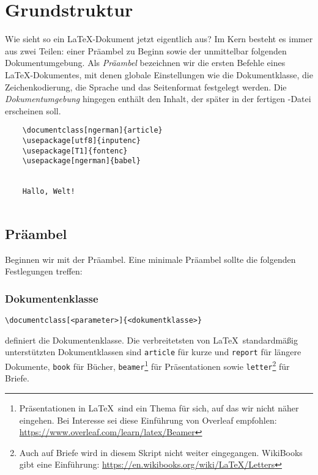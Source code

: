 \section{Grundstruktur}

Wie sieht so ein \LaTeX-Dokument jetzt eigentlich aus?
Im Kern besteht es immer aus zwei Teilen: einer Präambel zu Beginn sowie der unmittelbar folgenden Dokumentumgebung.
Als \emph{Präambel} bezeichnen wir die ersten Befehle eines \LaTeX-Dokumentes, mit denen globale Einstellungen wie die Dokumentklasse, die Zeichenkodierung, die Sprache und das Seitenformat festgelegt werden.
Die \emph{Dokumentumgebung} hingegen enthält den Inhalt, der später in der fertigen -Datei erscheinen soll.

\begin{listing}[H]
  \begin{verbatim}
    \documentclass[ngerman]{article}
    \usepackage[utf8]{inputenc}
    \usepackage[T1]{fontenc}
    \usepackage[ngerman]{babel}
  
    
    Hallo, Welt!
    
  \end{verbatim}
  \caption{Beispielhafter Aufbau eines einfachen \LaTeX-Dokuments mit Präambel und Dokumentumgebung}
  \label{lst:grundaufbau-latex-dokument}
\end{listing}

\subsection{Präambel}
Beginnen wir mit der Präambel.
Eine minimale Präambel sollte die folgenden Festlegungen treffen:

\subsubsection{Dokumentenklasse}\label{subsubsec:dokumentklasse}
\begin{verbatim}
\documentclass[<parameter>]{<dokumentklasse>}
\end{verbatim}

definiert die Dokumentenklasse. 
Die verbreitetsten von \LaTeX\ standardmäßig unterstützten Dokumentklassen sind \texttt{article} für kurze und \texttt{report} für längere Dokumente, \texttt{book} für Bücher, \texttt{beamer}\footnote{Präsentationen in \LaTeX\ sind ein Thema für sich, auf das wir nicht näher eingehen. Bei Interesse sei diese Einführung von Overleaf empfohlen: \url{https://www.overleaf.com/learn/latex/Beamer}} für Präsentationen sowie \texttt{letter}\footnote{Auch auf Briefe wird in diesem Skript nicht weiter eingegangen. WikiBooks gibt eine Einführung: \url{https://en.wikibooks.org/wiki/LaTeX/Letters}} für Briefe.

